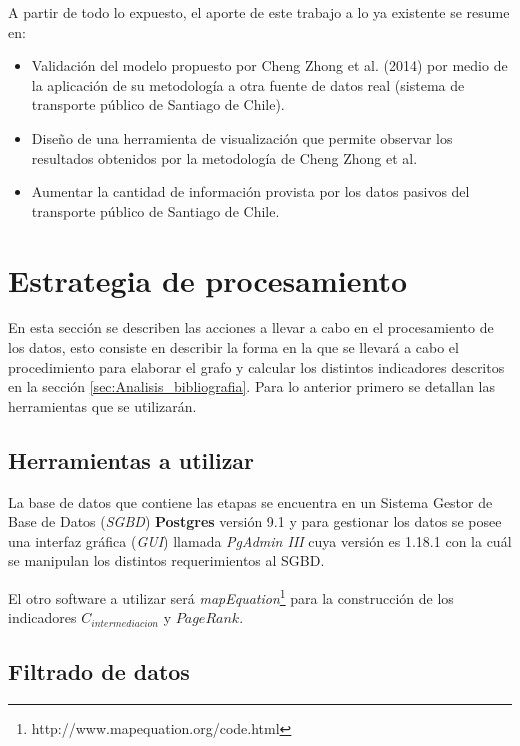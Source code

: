 \documentclass[12pt]{article}
\begin{document}
	A partir de todo lo expuesto, el aporte de este trabajo a lo ya existente se resume en:
	
	\begin{itemize}
	\item Validación del modelo propuesto por Cheng Zhong et al. (2014) \cite{Estructura_urbana} por medio de la aplicación de su metodología a otra fuente de datos real (sistema de transporte público de Santiago de Chile).
	\item Diseño de una herramienta de visualización que permite observar los resultados obtenidos por la metodología de Cheng Zhong et al.
	\item Aumentar la cantidad de información provista por los datos pasivos del transporte público de Santiago de Chile.
	
	\end{itemize}
	
    \newpage
    \section{Estrategia de procesamiento}
  
	En esta sección se describen las acciones a llevar a cabo en el procesamiento de los datos, esto consiste en describir la forma en la que se llevará a cabo el procedimiento para elaborar el grafo y calcular los distintos indicadores descritos en la sección \ref{sec:Analisis_bibliografia}. Para lo anterior primero se detallan las herramientas que se utilizarán.

	\subsection{Herramientas a utilizar}
	
	La base de datos que contiene las etapas se encuentra en un Sistema Gestor de Base de Datos (\textit{SGBD}) \textbf{Postgres} versión 9.1 y para gestionar los datos se posee una interfaz gráfica (\textit{GUI}) llamada \textit{PgAdmin III} cuya versión es 1.18.1 con la cuál se manipulan los distintos requerimientos al SGBD. 
	
	El otro software a utilizar será \textit{mapEquation}\footnote{http://www.mapequation.org/code.html} para la construcción de los indicadores $C_{intermediacion}$ y $PageRank$. 
	
	\subsection{Filtrado de datos}
	
\end{document}
